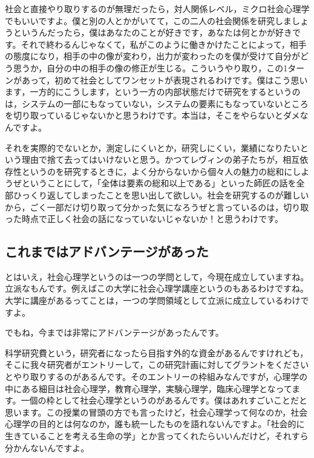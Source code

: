 \documentclass{ltjsbook}
\begin{document}
社会と直接やり取りするのが無理だったら，対人関係レベル，ミクロ社会心理学でもいいですよ。僕と別の人とかがいてて，この二人の社会関係を研究しましょうというんだったら，僕はあなたのことが好きです，あなたは何とかが好きです。それで終わるんじゃなくて，私がこのように働きかけたことによって，相手の態度になり，相手の中の像が変わり，出力が変わったのを僕が受けて自分がどう思うか，自分の中の相手の像の修正が生じる。こういうやり取り，この1ターンがあって，初めて社会としてワンセットが表現されるわけです。僕はこう思います，一方的にこうします，という一方の内部状態だけで研究をするというのは，システムの一部にもなっていない，システムの要素にもなっていないところを切り取っているじゃないかと思うわけです。本当は，そこをやらないとダメなんですよ。

それを実際的でないとか，測定しにくいとか，研究しにくい，業績になりたいという理由で捨て去ってはいけないと思う。かつてレヴィンの弟子たちが，相互依存性というのを研究するときに，よく分からないから個々人の魅力の総和にしようぜということにして，「全体は要素の総和以上である」といった師匠の話を全部ひっくり返してしまったことを思い出して欲しい。社会を研究するのが難しいから，ごく一部だけ切り取って分かった気になろうぜと言っているのは，切り取った時点で正しく社会の話になっていないじゃないか！と思うわけです。

\subsection{これまではアドバンテージがあった}

とはいえ，社会心理学というのは一つの学問として，今現在成立していますね。立派なもんです。例えばこの大学に社会心理学講座というのもあるわけですね。大学に講座があるってことは，一つの学問領域として立派に成立しているわけですよ。

でもね，今までは非常にアドバンテージがあったんです。

科学研究費という，研究者になったら目指す外的な資金があるんですけれども，そこに我々研究者がエントリーして，この研究計画に対してグラントをくださいとやり取りするのがあるんです。そのエントリーの枠組みなんですが，心理学の中にある細目は社会心理学，教育心理学，実験心理学，臨床心理学となってます。一個の枠として社会心理学というのがあるんです。僕はあれすごいことだと思います。この授業の冒頭の方でも言ったけど，社会心理学って何なのか，社会心理学の目的とは何なのか，誰も統一したものを語れないんですよ。「社会的に生きていることを考える生命の学」とか言ってくれたらいいんだけど，それすら分かんないんですよ。
\end{document}
